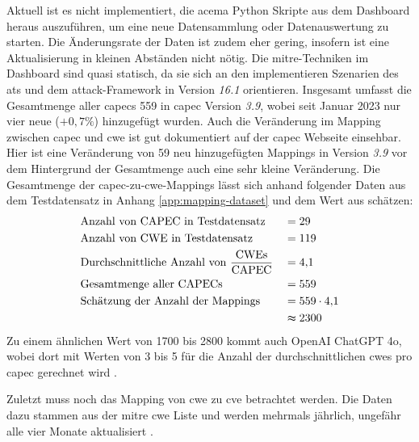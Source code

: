 \par Aktuell ist es nicht implementiert, die \gls{acema} Python Skripte aus dem Dashboard heraus auszuführen, um eine neue Datensammlung oder Datenauswertung zu starten. Die Änderungsrate der Daten ist zudem eher gering, insofern ist eine Aktualisierung in kleinen Abständen nicht nötig. Die \gls{mitre}-Techniken im Dashboard sind quasi statisch, da sie sich an den implementieren Szenarien des \glspl{at} und dem \gls{attack}-Framework in Version \textit{16.1} orientieren. Insgesamt umfasst die Gesamtmenge aller \glspl{capec} 559 in \gls{capec} Version \textit{3.9}, wobei seit Januar 2023 nur vier neue (\(+0{,}7\%\)) hinzugefügt wurden. Auch die Veränderung im Mapping zwischen \gls{capec} und \gls{cwe} ist gut dokumentiert auf der \gls{capec} Webseite einsehbar. Hier ist eine Veränderung von 59 neu hinzugefügten Mappings in Version \textit{3.9} vor dem Hintergrund der Gesamtmenge auch eine sehr kleine Veränderung. Die Gesamtmenge der \gls{capec}-zu-\gls{cwe}-Mappings lässt sich anhand folgender Daten aus dem Testdatensatz in Anhang \ref{app:mapping-dataset} und dem Wert aus \autocite{CAPECNewsEvents} schätzen:
\[
    \begin{alignedat}{2}
         & \text{Anzahl von CAPEC in Testdatensatz}            & \quad & = 29             \\
         & \text{Anzahl von CWE in Testdatensatz}              & \quad & = 119            \\
         & \text{Durchschnittliche Anzahl von } \frac{\text{CWEs}}{\text{CAPEC}} & \quad & =
        4{,}1                                                                                              \\
        & \text{Gesamtmenge aller CAPECs}                        & \quad & = 559 \\
        & \text{Schätzung der Anzahl der Mappings}                             & \quad & =
         559 \cdot 4{,}1                                                  \\
         &                                                                      &       & \thickapprox2300 \\
    \end{alignedat}
\]
Zu einem ähnlichen Wert von 1700 bis 2800 kommt auch OpenAI ChatGPT 4o, wobei dort mit Werten von 3 bis 5 für die Anzahl der durchschnittlichen \glspl{cwe} pro \gls{capec} gerechnet wird \autocite{openaichatgpt4oCAPECCWEMapping2024}.

Zuletzt muss noch das Mapping von \gls{cwe} zu \gls{cve} betrachtet werden. Die Daten dazu stammen aus der \gls{mitre} \gls{cwe} Liste und werden mehrmals jährlich, ungefähr alle vier Monate aktualisiert \autocite{CWEDownloads,AIWorkingGroupMeeting_slides20241115_CWEAIWGpdf2024}.

